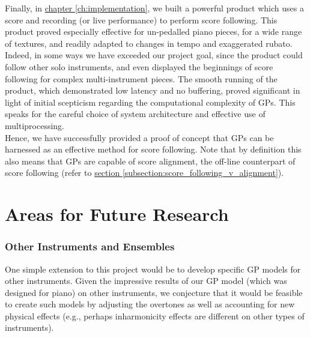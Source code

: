 Finally, in \hyperref[ch:implementation]{chapter \ref*{ch:implementation}}, we built a powerful product which uses a score and recording (or live performance) to perform score following. This product proved especially effective for un-pedalled piano pieces, for a wide range of textures, and readily adapted to changes in \gls{tempo} and exaggerated \gls{rubato}.  Indeed, in some ways we have exceeded our project goal, since the product could follow other solo instruments, and even displayed the beginnings of score following for complex multi-instrument pieces. The smooth running of the product, which demonstrated low latency and no buffering, proved significant in light of initial scepticism regarding the computational complexity of GPs. This speaks for the careful choice of system architecture and effective use of multiprocessing.\\

Hence, we have successfully provided a proof of concept that GPs can be harnessed as an effective method for score following. Note that by definition this also means that GPs are capable of score alignment, the off-line counterpart of score following (refer to \hyperref[subsection:score_following_v_alignment]{section \ref*{subsection:score_following_v_alignment}}). 


\section{Areas for Future Research}

\subsubsection{Other Instruments and Ensembles}

One simple extension to this project would be to develop specific GP models for other instruments. Given the impressive results of our GP model (which was designed for piano) on other instruments, we conjecture that it would be feasible to create such models by adjusting the overtones as well as accounting for new physical effects (e.g., perhaps inharmonicity effects are different on other types of instruments).\\

